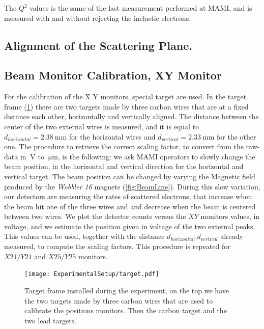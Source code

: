 The $Q^{2}$ values is the same of the last measurement performed at MAMI, and is measured with and without rejecting the inelastic electrons. 

\subsection{Alignment of the Scattering Plane.}

\subsection{Beam Monitor Calibration, XY Monitor}

For the calibration of the X Y monitors, special target are used. In the target frame (\ref{fig:targetFrame}) there are two targets made by three carbon wires that are at a fixed distance each other, horizontally and vertically aligned. The distance between the center of the two external wires is measured, and it is equal to $ d_{horizontal} = \SI{2.38}{\milli \meter}$ for the horizontal wires and $d_{vertical} = \SI{2.33}{\milli \meter}$ for the other one.
The procedure to retrieve the correct scaling factor, to convert from the raw-data in $\SI{}{\volt}$ to $\SI{}{\micro \meter}$, is the following: we ask MAMI operators to slowly change the beam position, in the horizontal and vertical direction for the horizontal and vertical target. The beam position can be changed by varying the Magnetic field produced by the \textit{Wobbler 16} magnets (\ref{fig:BeamLine}). 
During this slow variation, our detectors are measuring the rates of scattered electrons, that increase when the beam hit one of the three wires and and decrease when the beam is centered between two wires. We plot the detector counts versus the $XY$ monitors values, in voltage, and we estimate the position given in voltage of the two external peaks. This values can be used, together with the distance $d_{horizontal};d_{vertical}$ already measured, to compute the scaling factors. This procedure is repeated for $X21/Y21$ and $X25/Y25$ monitors.

\newpage
\begin{figure}[htb]
\centering
\texttt{[image: ExperimentalSetup/target.pdf]}
\caption{Target frame installed during the experiment, on the top we have the two targets made by three carbon wires that are used to calibrate the positions monitors. Then the carbon target and the two lead targets.}
\label{fig:targetFrame}
\end{figure}


